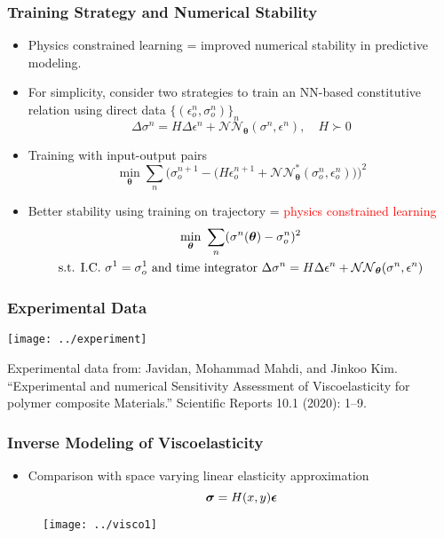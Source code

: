 \documentclass[usenames,dvipsnames]{beamer}
\newcommand{\bt}[0]{\bm{\theta}}
\begin{document}

\begin{frame}
	\frametitle{Training Strategy and Numerical Stability}
	
	\begin{itemize}
		\item Physics constrained learning = improved numerical stability in predictive modeling.
		\item For simplicity, consider two strategies to train an NN-based constitutive relation using direct data $\{(\epsilon_o^n, \sigma_o^n)\}_n$
		$$\Delta \sigma^n = H \Delta \epsilon^n + \mathcal{NN}_{\bt} (\sigma^n, \epsilon^n),\quad H \succ 0$$
		\item Training with input-output pairs
		$$\min_{\bt} \sum_n \Big(\sigma_o^{n+1} - \big(H\epsilon_o^{n+1} +  \mathcal{NN}_{\bt}^* (\sigma_o^n, \epsilon_o^n)\big) \Big)^2$$
		\item Better stability using training on trajectory = \textcolor{red}{physics constrained learning}
		\begin{gather*}
		\min_{\bt} \ \sum_n (\sigma^n(\bt) - \sigma_o^n)^2 \\
		\text{s.t. }\text{I.C.} \ \sigma^1 = \sigma^1_o \text{ and time integrator\ }
		{\small \Delta \sigma^n = H \Delta \epsilon^n + \mathcal{NN}_{\bt} (\sigma^n, \epsilon^n)}
		\end{gather*}
	\end{itemize}
\end{frame}

\begin{frame}
	\frametitle{Experimental Data}
	
	\texttt{[image: ../experiment]}
	
	{\scriptsize Experimental data from: Javidan, Mohammad Mahdi, and Jinkoo Kim. ``Experimental and numerical Sensitivity Assessment of Viscoelasticity for polymer composite Materials.'' Scientific Reports 10.1 (2020): 1--9.}
	
\end{frame}


\begin{frame}
	\frametitle{Inverse Modeling of Viscoelasticity}
	
	\begin{itemize}
		\item Comparison with space varying linear elasticity approximation
		\begin{equation*}
			\bm{\sigma} = H(x, y) \bm{\epsilon}
		\end{equation*}
	\end{itemize}
	\begin{figure}[hbt]
  \texttt{[image: ../visco1]}
\end{figure}

\end{frame}
\end{document}
